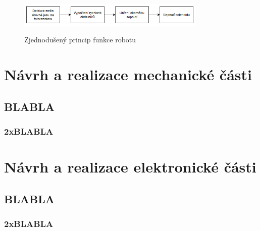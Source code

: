 \documentclass[12pt,oneside]{book} %
\begin{document}
\begin{figure}[h] \large\centering
\includegraphics[width=0.80\textwidth]{./img/blok_0.png}\\[1cm] 
\caption{Zjednodušený princip funkce robotu}
\label{blok_0}
\end{figure}   
\part{Návrh a realizace mechanické části}\label{mechanika}

\chapter{BLABLA}\label{BLABLA}
\section{2xBLABLA}\label{2xBLABLA}
\part{Návrh a realizace elektronické části}\label{elektro}

\chapter{BLABLA}\label{BLABLA}
\section{2xBLABLA}\label{2xBLABLA}

\end{document}
